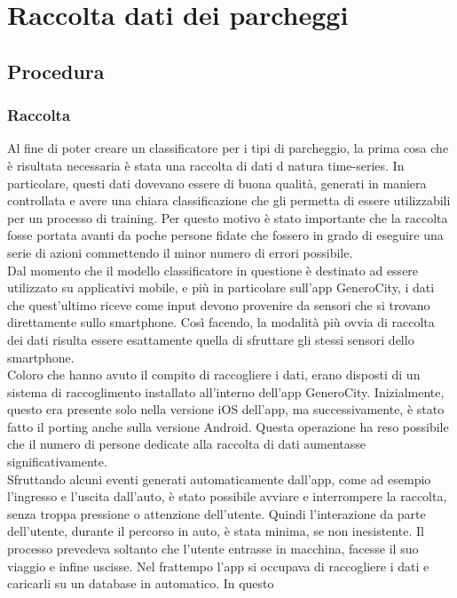 \chapter{Raccolta dati dei parcheggi}
\section{Procedura} 

\subsection{Raccolta}
Al fine di poter creare un classificatore per i tipi di parcheggio, la prima cosa
che è risultata necessaria è stata una raccolta di dati d natura time-series. In particolare, questi dati
dovevano essere di buona qualità, generati in maniera controllata e avere una chiara
classificazione che gli permetta di essere utilizzabili per un processo di training. 
Per questo motivo è stato importante che la raccolta fosse portata
avanti da poche persone fidate che fossero in grado di eseguire una serie di azioni
commettendo il minor numero di errori possibile.\\
Dal momento che il modello classificatore in questione è destinato ad essere utilizzato
su applicativi mobile, e più in particolare sull'app GeneroCity, i dati che quest'ultimo
riceve come input devono provenire da sensori che si trovano direttamente sullo smartphone.
Così facendo, la modalità più ovvia di raccolta dei dati risulta essere esattamente 
quella di sfruttare gli stessi sensori dello smartphone.\\
Coloro che hanno avuto il compito di raccogliere i dati, erano disposti di un sistema di
raccoglimento installato all'interno dell'app GeneroCity. Inizialmente, questo era presente
solo nella versione iOS dell'app, ma successivamente, è stato fatto il porting anche sulla
versione Android. Questa operazione ha reso possibile che il numero di persone dedicate alla
raccolta di dati aumentasse significativamente.\\
Sfruttando alcuni eventi generati automaticamente dall'app, come ad esempio l'ingresso e
l'uscita dall'auto, è stato possibile avviare e interrompere la raccolta, senza troppa
pressione o attenzione dell'utente. Quindi l'interazione da parte dell'utente,
durante il percorso in auto, è stata minima, se non inesistente. Il processo prevedeva soltanto
che l'utente entrasse in macchina, facesse il suo viaggio e infine uscisse. Nel frattempo 
l'app si occupava di raccogliere i dati e caricarli su un database in automatico. In questo
